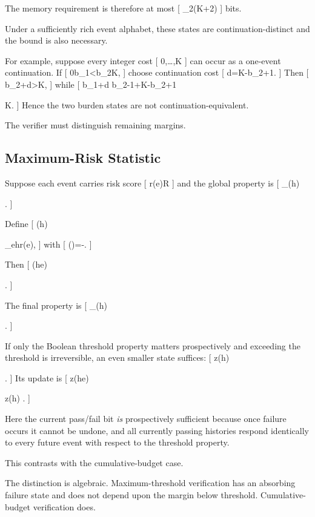 \documentclass[11pt]{article}
\begin{document}
The memory requirement is therefore at most
[
\left\lceil
\log_2(K+2)
\right\rceil
]
bits.

Under a sufficiently rich event alphabet, these states are continuation-distinct and the bound is also necessary.

For example, suppose every integer cost
[
0,\ldots,K
]
can occur as a one-event continuation. If
[
0\leq b_1<b_2\leq K,
]
choose continuation cost
[
d=K-b_2+1.
]
Then
[
b_2+d>K,
]
while
[
b_1+d
\leq
b_2-1+K-b_2+1

K.
]
Hence the two burden states are not continuation-equivalent.

The verifier must distinguish remaining margins.

\subsection{Maximum-Risk Statistic}

Suppose each event carries risk score
[
r(e)\in\mathbb R
]
and the global property is
[
\Phi_\tau(h)

.
]

Define
[
\sigma(h)

\max_{e\in h}r(e),
]
with
[
\sigma(\epsilon)=-\infty.
]

Then
[
\sigma(he)

.
]

The final property is
[
\Phi_\tau(h)

.
]

If only the Boolean threshold property matters prospectively and exceeding the threshold is irreversible, an even smaller state suffices:
[
z(h)

.
]
Its update is
[
z(he)

z(h)
\lor
{}.
]

Here the current pass/fail bit \emph{is} prospectively sufficient because once failure occurs it cannot be undone, and all currently passing histories respond identically to every future event with respect to the threshold property.

This contrasts with the cumulative-budget case.

The distinction is algebraic. Maximum-threshold verification has an absorbing failure state and does not depend upon the margin below threshold. Cumulative-budget verification does.
\end{document}

